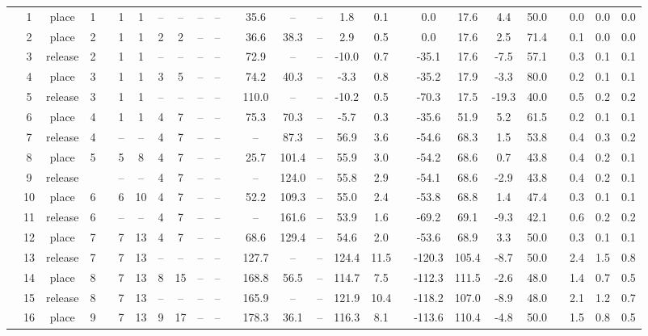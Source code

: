 \begin{landscape}
\begin{table}[h!]
\begin{threeparttable}
\begin{tabular}{c cccr ccccccr cccccr ccccr ccc}
				\\
				\specialrule{0.06em}{0.2em}{.2em}
				\rowcolor{lightgray} &1 &place &1 &&1 &1 &-- &-- &-- &-- &&35.6 &-- &-- &1.8 &0.1 &&0.0 &17.6 &4.4 &50.0 &&0.0 &0.0 &0.0 \\
				\rowcolor{lightgray} &2 &place &2 &&1 &1 &2 &2 &-- &-- &&36.6 &38.3 &-- &2.9 &0.5 &&0.0 &17.6 &2.5 &71.4 &&0.1 &0.0 &0.0 \\
				&3 &release &2 &&1 &1 &-- &-- &-- &-- &&72.9 &-- &-- &-10.0 &0.7 &&-35.1 &17.6 &-7.5 &57.1 &&0.3 &0.1 &0.1 \\
				&4 &place &3 &&1 &1 &3 &5 &-- &-- &&74.2 &40.3 &-- &-3.3 &0.8 &&-35.2 &17.9 &-3.3 &80.0 &&0.2 &0.1 &0.1 \\
				&5 &release &3 &&1 &1 &-- &-- &-- &-- &&110.0 &-- &-- &-10.2 &0.5 &&-70.3 &17.5 &-19.3 &40.0 &&0.5 &0.2 &0.2 \\
				&6 &place &4 &&1 &1 &4 &7 &-- &-- &&75.3 &70.3 &-- &-5.7 &0.3 &&-35.6 &51.9 &5.2 &61.5 &&0.2 &0.1 &0.1 \\
				\rowcolor{lightgray} &7 &release &4 &&-- &-- &4 &7 &-- &-- &&-- &87.3 &-- &56.9 &3.6 &&-54.6 &68.3 &1.5 &53.8 &&0.4 &0.3 &0.2 \\
				\rowcolor{lightgray} &8 &place &5 &&5 &8 &4 &7 &-- &-- &&25.7 &101.4 &-- &55.9 &3.0 &&-54.2 &68.6 &0.7 &43.8 &&0.4 &0.2 &0.1 \\
				&9 &release & &&-- &-- &4 &7 &-- &-- &&-- &124.0 &-- &55.8 &2.9 &&-54.1 &68.6 &-2.9 &43.8 &&0.4 &0.2 &0.1 \\
				&10 &place &6 &&6 &10 &4 &7 &-- &-- &&52.2 &109.3 &-- &55.0 &2.4 &&-53.8 &68.8 &1.4 &47.4 &&0.3 &0.1 &0.1 \\
				&11 &release &6 &&-- &-- &4 &7 &-- &-- &&-- &161.6 &-- &53.9 &1.6 &&-69.2 &69.1 &-9.3 &42.1 &&0.6 &0.2 &0.2 \\
				&12 &place &7 &&7 &13 &4 &7 &-- &-- &&68.6 &129.4 &-- &54.6 &2.0 &&-53.6 &68.9 &3.3 &50.0 &&0.3 &0.1 &0.1 \\
				\rowcolor{lightgray} &13 &release &7 &&7 &13 &-- &-- &-- &-- &&127.7 &-- &-- &124.4 &11.5 &&-120.3 &105.4 &-8.7 &50.0 &&2.4 &1.5 &0.8 \\
				\rowcolor{lightgray} &14 &place &8 &&7 &13 &8 &15 &-- &-- &&168.8 &56.5 &-- &114.7 &7.5 &&-112.3 &111.5 &-2.6 &48.0 &&1.4 &0.7 &0.5 \\
				&15 &release &8 &&7 &13 &-- &-- &-- &-- &&165.9 &-- &-- &121.9 &10.4 &&-118.2 &107.0 &-8.9 &48.0 &&2.1 &1.2 &0.7 \\
				&16 &place &9 &&7 &13 &9 &17 &-- &-- &&178.3 &36.1 &-- &116.3 &8.1 &&-113.6 &110.4 &-4.8 &50.0 &&1.5 &0.8 &0.5 \\

\end{tabular}
\end{threeparttable}
\end{table}
\end{landscape}
